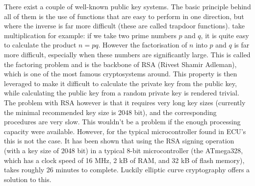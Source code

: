 \documentclass[master=cws,masteroption=vs,english]{kulemt}
\begin{document}
There exist a couple of well-known public key systems. The basic principle behind all of them is the use of functions that are easy to perform in one direction, but where the inverse is far more difficult (these are called trapdoor functions). take multiplication for example: if we take two prime numbers $p$ and $q$, it is quite easy to calculate the product $ n=pq $. However the factorisation of $n$ into $p$ and $q$ is far more difficult, especially when these numbers are significantly large. This is called the factoring problem and is the backbone of RSA (Rivest Shamir Adleman), which is one of the most famous cryptosystems around. This property is then leveraged to make it difficult to calculate the private key from the public key, while calculating the public key from a random private key is rendered trivial. The problem with RSA however is that it requires very long key sizes (currently the minimal recommended key size is 2048 bit)\cite{wiki:RSA}, and the corresponding procedures are very slow. This wouldn't be a problem if the enough processing capacity were available. However, for the typical microcontroller found in ECU's this is not the case. It has been shown that using the RSA signing operation (with a key size of 2048 bit) in a typical 8-bit microcontroller (the ATmega328, which has a clock speed of 16 MHz, 2 kB of RAM, and 32 kB of flash memory), takes roughly 26 minutes to complete\cite{Sethi}. Luckily elliptic curve cryptography offers a solution to this.
\end{document}
